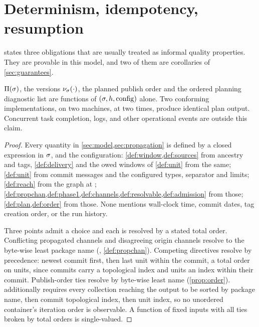 \section{Determinism, idempotency, resumption}
\label{sec:determinism}

 states three obligations that are usually treated as informal
quality properties. They are provable in this model, and two of them are
corollaries of \cref{sec:guarantees}.

\begin{theorem}[determinism]
\label{thm:determinism}
$\Pi(\sigma)$, the versions $\nu_{\sigma}(\cdot)$, the planned publish order and the ordered planning
diagnostic list are functions of $(\sigma, h, \mathrm{config})$ alone. Two
conforming implementations, on two machines, at two times, produce identical plan output. Concurrent task completion, logs, and other operational events are outside this claim.
\end{theorem}

\begin{proof}
Every quantity in \cref{sec:model,sec:propagation} is defined by a closed
expression in $\sigma$, \Head{} and the configuration:
\cref{def:window,def:sources} from ancestry and tags, \cref{def:delivery} and
the owed windows of \cref{def:unit} from the same;
\cref{def:unit} from commit messages and the configured types, separator and
limits; \cref{def:reach} from the graph at \Head{};
\cref{def:propchan,def:phase1,def:channels,def:resolvable,def:admission} from
those; \cref{def:plan,def:order} from those. None mentions wall-clock time,
commit dates, tag creation order, or the run history.

Three points admit a choice and each is resolved by a stated total order.
Conflicting propagated channels and disagreeing origin channels resolve to the
byte-wise least package name (, \cref{def:propchan}). Competing
directives resolve by  precedence: newest commit first, then last
unit within the commit, a total order on units, since commits carry a
topological index and units an index within their commit. Publish-order ties
resolve by byte-wise least name (\cref{prop:order}).  additionally
requires every collection reaching the output to be sorted by package name,
then commit topological index, then unit index, so no unordered container's
iteration order is observable. A function of fixed inputs with all ties broken
by total orders is single-valued.
\end{proof}

